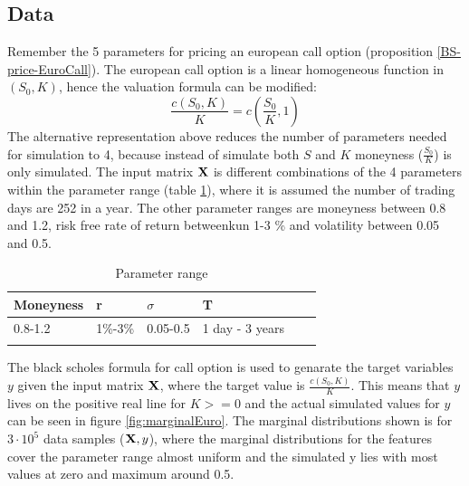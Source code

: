 \subsection{Data}
Remember the 5 parameters for pricing an european call option (proposition \ref{BS-price-EuroCall}).  The european call option is a linear homogeneous function in $(S_0,K)$, hence the valuation formula can be modified:
$$\frac{c(S_0,K)}{K}=c(\frac{S_0}{K},1)$$
The alternative representation above reduces the number of parameters needed for simulation to 4, because instead of simulate both $S$ and $K$ moneyness ($\frac{S_0}{K}$) is only  simulated. The input matrix $\mathbf{X}$ is different combinations of the 4 parameters within the parameter range (table \ref{tab:euroParRange}), where it is assumed the number of trading days are 252 in a year. The other parameter ranges are moneyness between 0.8 and 1.2, risk free rate of return betweenkun 1-3 \% and volatility between 0.05 and 0.5. 

\begin{table}[H]
\caption{Parameter range}
\label{tab:euroParRange}
\centering
\begin{tabular}{l l l l l l }
\toprule
\textbf{Moneyness} & \textbf{r} & \textbf{$\sigma$} & \textbf{T} \\
\midrule
0.8-1.2 & 1\%-3\% & 0.05-0.5 & 1 day - 3 years\\ 
\bottomrule\\
\end{tabular}
\end{table}

The black scholes formula for call option is used to genarate the target variables $y$ given the input matrix $\mathbf{X}$, where the target value is $\frac{c(S_0,K)}{K}$. This means that $y$ lives on the positive real line for $K>=0$ and the actual simulated values for $y$ can be seen in figure \ref{fig:marginalEuro}. The marginal distributions shown is for $3\cdot 10^{5}$ data samples ($\mathbf{X},y$), where the marginal distributions for the features cover the parameter range almost uniform and the simulated y lies with most values at zero and maximum around 0.5. 

